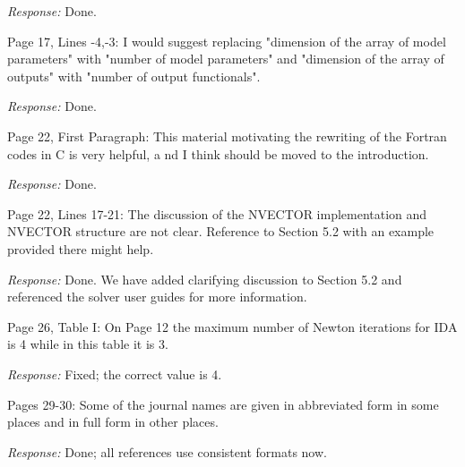 \documentclass[12pt]{letter}
\begin{document}
{\em Response:} Done.

Page 17, Lines -4,-3: I would suggest replacing "dimension of the array
of model parameters" with "number of model parameters" and "dimension of
the array of outputs" with "number of output functionals".

{\em Response:} Done.

Page 22, First Paragraph: This material motivating the rewriting of
the Fortran codes in C is very helpful, a nd I think should be moved
to the introduction.

{\em Response: } Done.

Page 22, Lines 17-21: The discussion of the NVECTOR implementation and
NVECTOR structure are not clear.  Reference to Section 5.2 with an
example provided there might help.

{\em Response: } Done.  We have added clarifying discussion to
Section 5.2 and referenced the solver user guides for more
information.

Page 26, Table I: On Page 12 the maximum number of Newton iterations
for IDA is 4 while in this table it is 3.

{\em Response:} Fixed; the correct value is 4.

Pages 29-30: Some of the journal names are given in abbreviated form
in some places and in full form in other places.

{\em Response:} Done; all references use consistent formats now.
\end{document}
